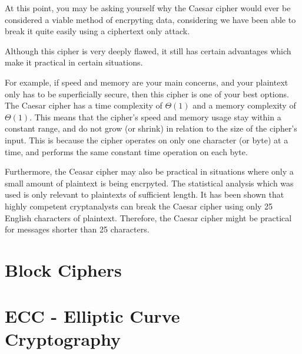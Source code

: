 \documentclass[12pt, a4paper, draft]{report}
\begin{document}
At this point, you may be asking yourself why the Caesar cipher would
ever be considered a viable method of encrpyting data, considering we
have been able to break it quite easily using a ciphertext only attack.

Although this cipher is very deeply flawed, it still has certain
advantages which make it practical in certain situations.

For example, if speed and memory are your main concerns, and your
plaintext only has to be superficially secure, then this cipher is one
of your best options. The Caesar cipher has a time complexity of
$\Theta(1)$ and a memory complexity of $\Theta(1)$. This means that
the cipher's speed and memory usage stay within a constant range, and
do not grow (or shrink) in relation to the size of the cipher's input.
This is because the cipher operates on only one character (or byte) at
a time, and performs the same constant time operation on each byte.

Furthermore, the Ceasar cipher may also be practical in situations where
only a small amount of plaintext is being encrpyted. The statistical
analysis which was used is only relevant to plaintexts of sufficient
length. It has been shown that highly competent cryptanalysts can break
the Caesar cipher using only 25 English characters of plaintext.
Therefore, the Caesar cipher might be practical for messages shorter than
25 characters.

\section{Block Ciphers}

\section{ECC - Elliptic Curve Cryptography}
\end{document}
